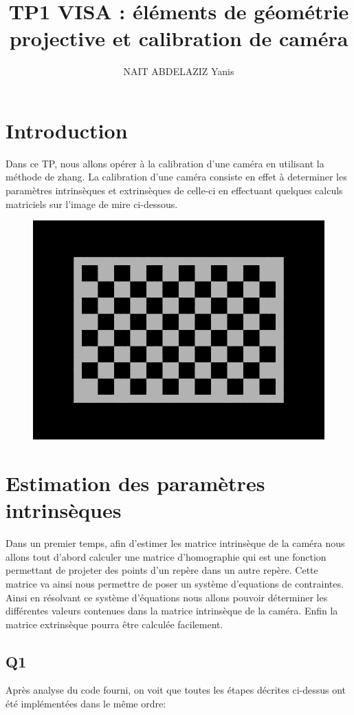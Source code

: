 \documentclass[a4paper,12pt]{report}
\title{TP1 VISA : éléments de géométrie projective et calibration de caméra}
\author{NAIT ABDELAZIZ Yanis}
\begin{document}
\maketitle
\section*{Introduction}
Dans ce TP, nous allons opérer à la calibration d'une caméra en utilisant la méthode de zhang. La calibration d'une caméra consiste en effet à determiner les paramètres intrinsèques et extrinsèques de celle-ci en effectuant quelques calculs matriciels sur l'image de mire ci-dessous.
\begin{figure}[!ht]
\center
\includegraphics[scale=0.3]{./image/mire.png}
\end{figure}
\section*{Estimation des paramètres intrinsèques}
Dans un premier temps, afin d'estimer les matrice intrinsèque de la caméra nous allons tout d'abord calculer une matrice d'homographie qui est une fonction permettant de projeter des points d'un repère dans un autre repère. Cette matrice va ainsi nous permettre de poser un système d'equations de contraintes. Ainsi en résolvant ce système d'équations nous allons pouvoir déterminer les différentes valeurs contenues dans la matrice intrinsèque de la caméra. Enfin la matrice extrinsèque pourra être calculée facilement.
\subsection*{Q1}
Après analyse du code fourni, on voit que toutes les étapes décrites ci-dessus ont été implémentées dans le même ordre:
\end{document}
